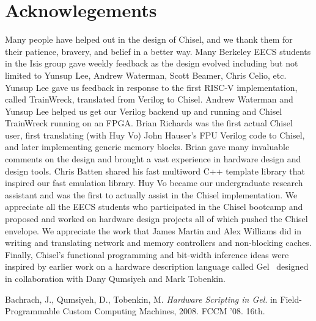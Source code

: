 \documentclass[10pt]{article}
\def\note#1{\noindent{\bf [Note: #1]}}
\begin{document}
\section{Acknowlegements}

Many people have helped out in the design of Chisel, and we thank them
for their patience, bravery, and belief in a better way.  Many
Berkeley EECS students in the Isis group gave weekly feedback as the
design evolved including but not limited to Yunsup Lee, Andrew
Waterman, Scott Beamer, Chris Celio, etc.  Yunsup Lee gave us feedback
in response to the first RISC-V implementation, called TrainWreck,
translated from Verilog to Chisel.  Andrew Waterman and Yunsup Lee
helped us get our Verilog backend up and running and Chisel TrainWreck
running on an FPGA.  Brian Richards was the first actual Chisel user,
first translating (with Huy Vo) John Hauser's FPU Verilog code to
Chisel, and later implementing generic memory blocks.  Brian gave many
invaluable comments on the design and brought a vast experience in
hardware design and design tools.  Chris Batten shared his fast
multiword C++ template library that inspired our fast emulation
library.  Huy Vo became our undergraduate research assistant and was
the first to actually assist in the Chisel implementation.  We
appreciate all the EECS students who participated in the Chisel
bootcamp and proposed and worked on hardware design projects all of
which pushed the Chisel envelope.  We appreciate the work that James
Martin and Alex Williams did in writing and translating network and
memory controllers and non-blocking caches.  Finally, Chisel's
functional programming and bit-width inference ideas were inspired by
earlier work on a hardware description language called Gel~\cite{gel} designed in
collaboration with Dany Qumsiyeh and Mark Tobenkin.


\begin{thebibliography}{50}
 Bachrach, J., Qumsiyeh, D., Tobenkin, M. \textsl{Hardware Scripting in Gel}.
in Field-Programmable Custom Computing Machines, 2008. FCCM '08. 16th.
\end{thebibliography}
\end{document}
